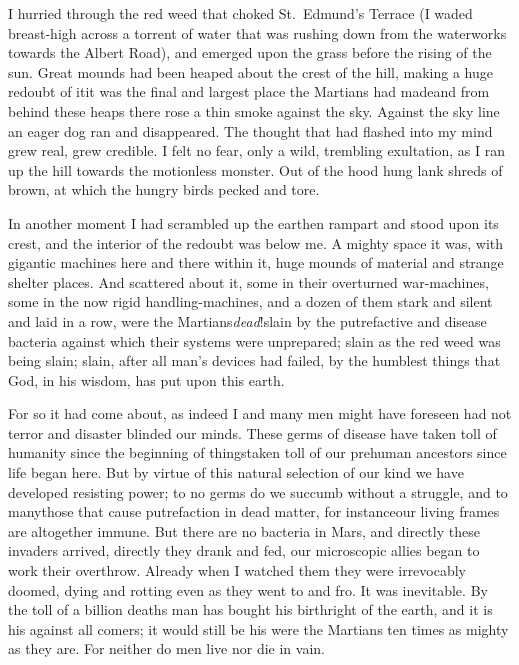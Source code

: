 I hurried through the red weed that choked St.\ Edmund's Terrace (I
waded breast-high across a torrent of water that was rushing down
from the waterworks towards the Albert Road), and emerged upon the
grass before the rising of the sun. Great mounds had been heaped
about the crest of the hill, making a huge redoubt of it\dash{}it was
the final and largest place the Martians had made\dash{}and from behind
these heaps there rose a thin smoke against the sky. Against the
sky line an eager dog ran and disappeared. The thought that had
flashed into my mind grew real, grew credible. I felt no fear, only
a wild, trembling exultation, as I ran up the hill towards the
motionless monster. Out of the hood hung lank shreds of brown, at
which the hungry birds pecked and tore.

In another moment I had scrambled up the earthen rampart and stood
upon its crest, and the interior of the redoubt was below me. A
mighty space it was, with gigantic machines here and there within
it, huge mounds of material and strange shelter places. And
scattered about it, some in their overturned war-machines, some in
the now rigid handling-machines, and a dozen of them stark and
silent and laid in a row, were the Martians\dash{}\emph{dead}!\dash{}slain by
the putrefactive and disease bacteria against which their systems
were unprepared; slain as the red weed was being slain; slain,
after all man's devices had failed, by the humblest things that
God, in his wisdom, has put upon this earth.

For so it had come about, as indeed I and many men might have
foreseen had not terror and disaster blinded our minds. These germs
of disease have taken toll of humanity since the beginning of
things\dash{}taken toll of our prehuman ancestors since life began here.
But by virtue of this natural selection of our kind we have
developed resisting power; to no germs do we succumb without a
struggle, and to many\dash{}those that cause putrefaction in dead
matter, for instance\dash{}our living frames are altogether immune. But
there are no bacteria in Mars, and directly these invaders arrived,
directly they drank and fed, our microscopic allies began to work
their overthrow. Already when I watched them they were irrevocably
doomed, dying and rotting even as they went to and fro. It was
inevitable. By the toll of a billion deaths man has bought his
birthright of the earth, and it is his against all comers; it would
still be his were the Martians ten times as mighty as they are. For
neither do men live nor die in vain.

